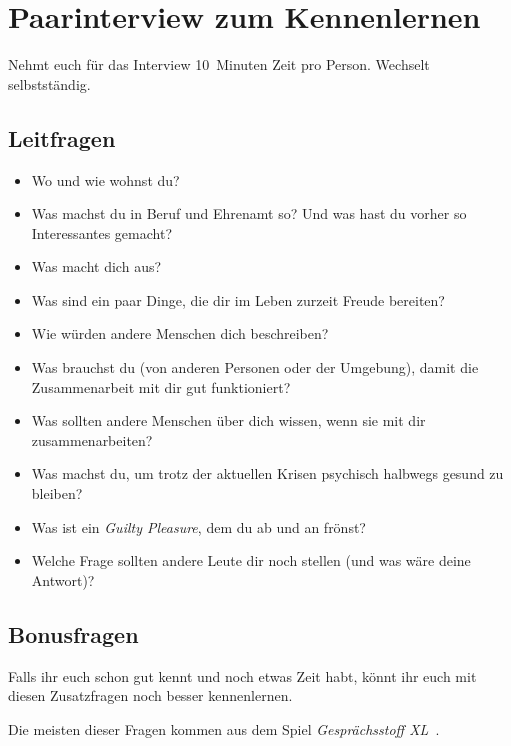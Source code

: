 \section{Paarinterview zum Kennenlernen}
\label{paarinterview}

Nehmt euch für das Interview 10~Minuten Zeit pro Person. Wechselt selbstständig.

\subsection{Leitfragen}

\begin{itemize}
    \item Wo und wie wohnst du?
    \item Was machst du in Beruf und Ehrenamt so? Und was hast du vorher so Interessantes gemacht?
    \item Was macht dich aus?
    \item Was sind ein paar Dinge, die dir im Leben zurzeit Freude bereiten?
    \item Wie würden andere Menschen dich beschreiben?
    \item Was brauchst du (von anderen Personen oder der Umgebung), damit die Zusammenarbeit mit dir gut funktioniert?
    \item Was sollten andere Menschen über dich wissen, wenn sie mit dir zusammenarbeiten?
    \item Was machst du, um trotz der aktuellen Krisen psychisch halbwegs gesund zu bleiben?
    \item Was ist ein \emph{Guilty Pleasure}, dem du ab und an frönst?
    \item Welche Frage sollten andere Leute dir noch stellen (und was wäre deine Antwort)?
\end{itemize}

\subsection{Bonusfragen}

Falls ihr euch schon gut kennt und noch etwas Zeit habt, könnt ihr euch mit diesen Zusatzfragen noch besser kennenlernen.

Die meisten dieser Fragen kommen aus dem Spiel \emph{Gesprächsstoff XL}~\cite{gespraechsstoff}.


